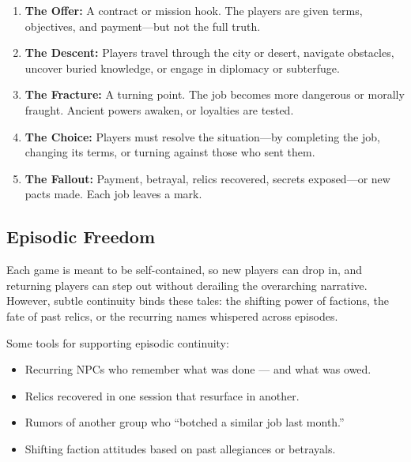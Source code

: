 \begin{enumerate}
    \item \textbf{The Offer:} A contract or mission hook. The players are given terms, objectives, and payment—but not the full truth.
    
    \item \textbf{The Descent:} Players travel through the city or desert, navigate obstacles, uncover buried knowledge, or engage in diplomacy or subterfuge.

    \item \textbf{The Fracture:} A turning point. The job becomes more dangerous or morally fraught. Ancient powers awaken, or loyalties are tested.

    \item \textbf{The Choice:} Players must resolve the situation—by completing the job, changing its terms, or turning against those who sent them.

    \item \textbf{The Fallout:} Payment, betrayal, relics recovered, secrets exposed—or new pacts made. Each job leaves a mark.
\end{enumerate}

\vspace{0.5\baselineskip}
\subsection*{Episodic Freedom}

Each game is meant to be self-contained, so new players can drop in, and returning players can step out without derailing the overarching narrative. However, subtle continuity binds these tales: the shifting power of factions, the fate of past relics, or the recurring names whispered across episodes.

Some tools for supporting episodic continuity:

\begin{itemize}
    \item Recurring NPCs who remember what was done — and what was owed.
    \item Relics recovered in one session that resurface in another.
    \item Rumors of another group who “botched a similar job last month.”
    \item Shifting faction attitudes based on past allegiances or betrayals.
\end{itemize}

\vspace{0.5\baselineskip}
